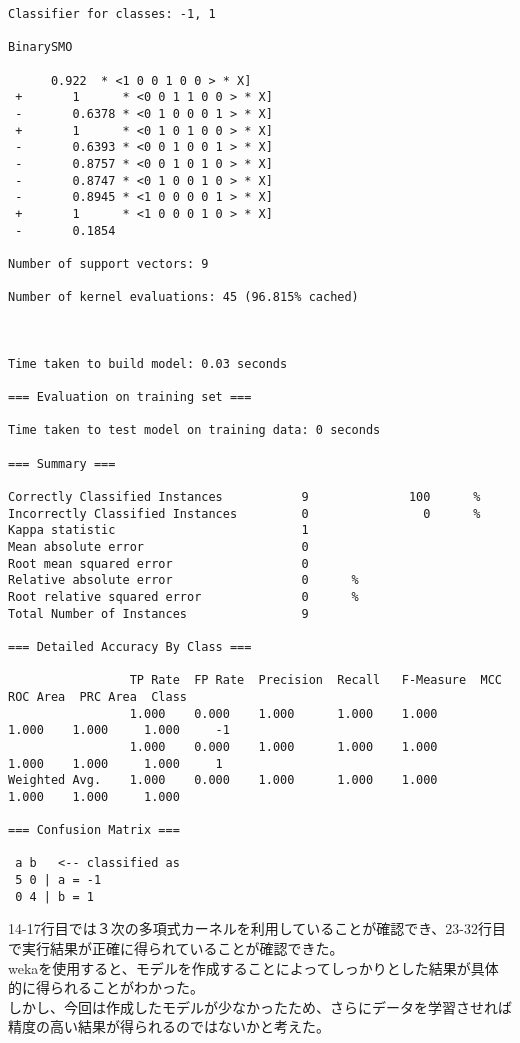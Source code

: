 \documentclass[dvipdfmx,uplatex]{jsarticle}
\begin{document}
\begin{spacing}{1.4}
\begin{lstlisting}[caption=wekaを用いて上記のデータを学習させた結果]
Classifier for classes: -1, 1

BinarySMO

      0.922  * <1 0 0 1 0 0 > * X]
 +       1      * <0 0 1 1 0 0 > * X]
 -       0.6378 * <0 1 0 0 0 1 > * X]
 +       1      * <0 1 0 1 0 0 > * X]
 -       0.6393 * <0 0 1 0 0 1 > * X]
 -       0.8757 * <0 0 1 0 1 0 > * X]
 -       0.8747 * <0 1 0 0 1 0 > * X]
 -       0.8945 * <1 0 0 0 0 1 > * X]
 +       1      * <1 0 0 0 1 0 > * X]
 -       0.1854

Number of support vectors: 9

Number of kernel evaluations: 45 (96.815% cached)



Time taken to build model: 0.03 seconds

=== Evaluation on training set ===

Time taken to test model on training data: 0 seconds

=== Summary ===

Correctly Classified Instances           9              100      %
Incorrectly Classified Instances         0                0      %
Kappa statistic                          1
Mean absolute error                      0
Root mean squared error                  0
Relative absolute error                  0      %
Root relative squared error              0      %
Total Number of Instances                9

=== Detailed Accuracy By Class ===

                 TP Rate  FP Rate  Precision  Recall   F-Measure  MCC      ROC Area  PRC Area  Class
                 1.000    0.000    1.000      1.000    1.000      1.000    1.000     1.000     -1
                 1.000    0.000    1.000      1.000    1.000      1.000    1.000     1.000     1
Weighted Avg.    1.000    0.000    1.000      1.000    1.000      1.000    1.000     1.000

=== Confusion Matrix ===

 a b   <-- classified as
 5 0 | a = -1
 0 4 | b = 1
\end{lstlisting}

14-17行目では３次の多項式カーネルを利用していることが確認でき、23-32行目で実行結果が正確に得られていることが確認できた。\\

wekaを使用すると、モデルを作成することによってしっかりとした結果が具体的に得られることがわかった。\\
しかし、今回は作成したモデルが少なかったため、さらにデータを学習させれば精度の高い結果が得られるのではないかと考えた。

\end{spacing}
\end{document}
